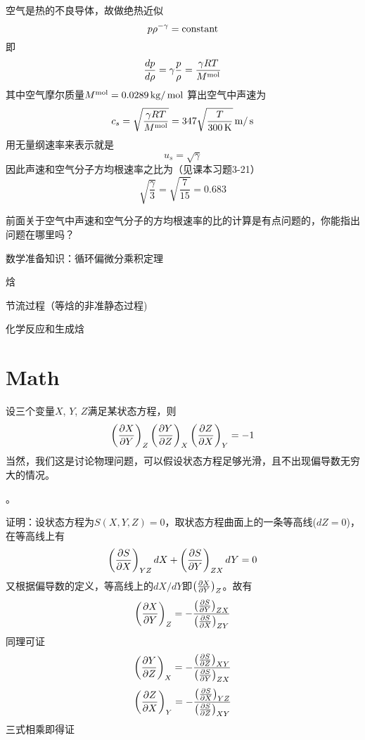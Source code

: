 \documentclass[CJK]{beamer}
\begin{document}
\begin{frame}
\bch
{\small
空气是热的不良导体，故做绝热近似 
$$p\rho^{-\gamma} = \mathrm{constant}$$
即 $$\frac{dp}{d\rho} = \gamma \frac{p}{\rho} =  \frac{\gamma R T}{M^{\rm mol}}$$
其中空气摩尔质量$M^{\rm mol} = 0.0289 \,\mathrm{kg}/\,\mathrm{mol}$
算出空气中声速为
$$c_s = \sqrt{\frac{\gamma RT}{M^{\rm mol}}} = 347 \sqrt{\frac{T}{300\,\mathrm{K}}} \,\mathrm{m}/\,\mathrm{s}$$
用无量纲速率来表示就是
$$u_s = \sqrt{\gamma}$$
因此声速和空气分子方均根速率之比为（见课本习题3-21）
$$\sqrt{\frac{\gamma}{3}} = \sqrt{\frac{7}{15}} = 0.683$$
}
\ech
\end{frame}

\begin{frame}
\bch


前面关于空气中声速和空气分子的方均根速率的比的计算是有点问题的，你能指出问题在哪里吗？

\ech
\end{frame}


\begin{frame}
\bch
\bitem
\item{数学准备知识：循环偏微分乘积定理}
\item{焓}
\item{节流过程（等焓的非准静态过程)}
\item{化学反应和生成焓}
\eitem
\ech
\end{frame}

\section{Math}

\begin{frame}
\bch
设三个变量$X$, $Y$, $Z$满足某状态方程，则
{\blue 
$$\left(\frac{\partial X}{\partial Y}\right)_{Z}  \left(\frac{\partial Y}{\partial Z}\right)_{X} \left(\frac{\partial Z}{\partial X}\right)_{Y} = -1$$
}
当然，我们这是讨论物理问题，可以假设状态方程足够光滑，且不出现偏导数无穷大的情况。

\skipline

。
\ech
\end{frame}

\begin{frame}
\bch
{\scriptsize
证明：设状态方程为$S(X, Y, Z) = 0$，取状态方程曲面上的一条等高线($dZ = 0$)，在等高线上有
$$\left(\frac{\partial S}{\partial X}\right)_{YZ} dX + \left(\frac{\partial S}{\partial Y}\right)_{ZX} dY = 0$$
又根据偏导数的定义，等高线上的$dX/dY$即$\left(\frac{\partial X}{\partial Y}\right)_{Z}$。故有
$$\left(\frac{\partial X}{\partial Y}\right)_{Z} = -\frac{\left(\frac{\partial S}{\partial Y}\right)_{ZX}}{\left(\frac{\partial S}{\partial X}\right)_{ZY}}$$
同理可证
$$\left(\frac{\partial Y}{\partial Z}\right)_{X} = -\frac{\left(\frac{\partial S}{\partial Z}\right)_{XY}}{\left(\frac{\partial S}{\partial Y}\right)_{ZX}}$$
$$\left(\frac{\partial Z}{\partial X}\right)_{Y} = -\frac{\left(\frac{\partial S}{\partial X}\right)_{YZ}}{\left(\frac{\partial S}{\partial Z}\right)_{XY}}$$
三式相乘即得证
}
\ech
\end{frame}
\end{document}
